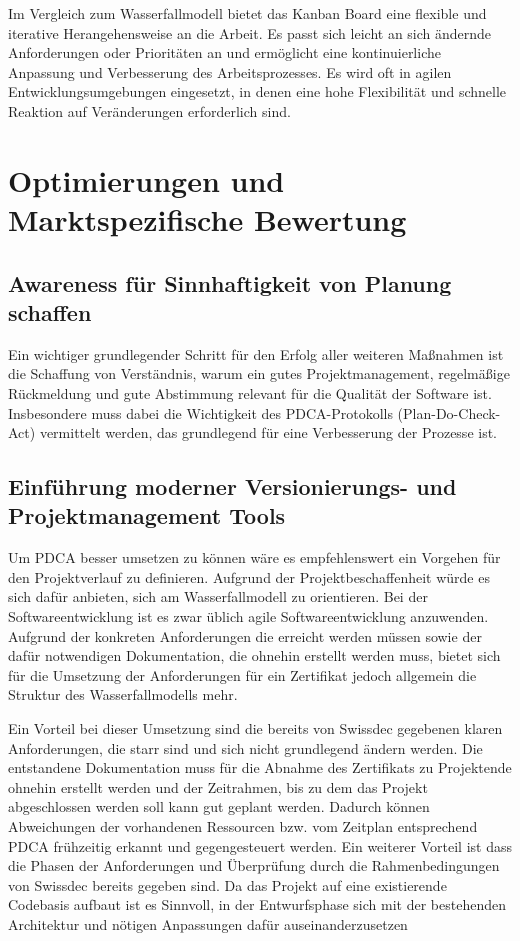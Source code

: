 Im Vergleich zum Wasserfallmodell bietet das Kanban Board eine flexible und iterative Herangehensweise an die Arbeit. Es passt sich leicht an sich ändernde Anforderungen oder Prioritäten an und ermöglicht eine kontinuierliche Anpassung und Verbesserung des Arbeitsprozesses. Es wird oft in agilen Entwicklungsumgebungen eingesetzt, in denen eine hohe Flexibilität und schnelle Reaktion auf Veränderungen erforderlich sind.

\section{Optimierungen und Marktspezifische Bewertung}

\subsection{Awareness für Sinnhaftigkeit von Planung schaffen}

Ein wichtiger grundlegender Schritt für den Erfolg aller weiteren Maßnahmen ist die Schaffung von Verständnis, warum ein gutes Projektmanagement, regelmäßige Rückmeldung und gute Abstimmung relevant für die Qualität der Software ist. 
Insbesondere muss dabei die Wichtigkeit des PDCA-Protokolls (Plan-Do-Check-Act) vermittelt werden, das grundlegend für eine Verbesserung der Prozesse ist.

\subsection{Einführung moderner Versionierungs- und Projektmanagement Tools}

Um PDCA besser umsetzen zu können wäre es empfehlenswert ein Vorgehen für den Projektverlauf zu definieren.
Aufgrund der Projektbeschaffenheit würde es sich dafür anbieten, sich am Wasserfallmodell zu orientieren. Bei der Softwareentwicklung ist es zwar üblich agile Softwareentwicklung anzuwenden.
Aufgrund der konkreten Anforderungen die erreicht werden müssen sowie der dafür notwendigen Dokumentation, die ohnehin erstellt werden muss, bietet sich für die Umsetzung der Anforderungen für ein Zertifikat jedoch allgemein die Struktur des Wasserfallmodells mehr.

Ein Vorteil bei dieser Umsetzung sind die bereits von Swissdec gegebenen klaren Anforderungen, die starr sind und sich nicht grundlegend ändern werden. Die entstandene Dokumentation muss für die Abnahme des Zertifikats zu Projektende ohnehin erstellt werden und der Zeitrahmen, bis zu dem das Projekt abgeschlossen werden soll kann gut geplant werden. Dadurch können Abweichungen der vorhandenen Ressourcen bzw. vom Zeitplan entsprechend PDCA frühzeitig erkannt und gegengesteuert werden.
Ein weiterer Vorteil ist dass die Phasen der Anforderungen und Überprüfung durch die Rahmenbedingungen von Swissdec bereits gegeben sind.
Da das Projekt auf eine existierende Codebasis aufbaut ist es Sinnvoll, in der Entwurfsphase sich mit der bestehenden Architektur und nötigen Anpassungen dafür auseinanderzusetzen

